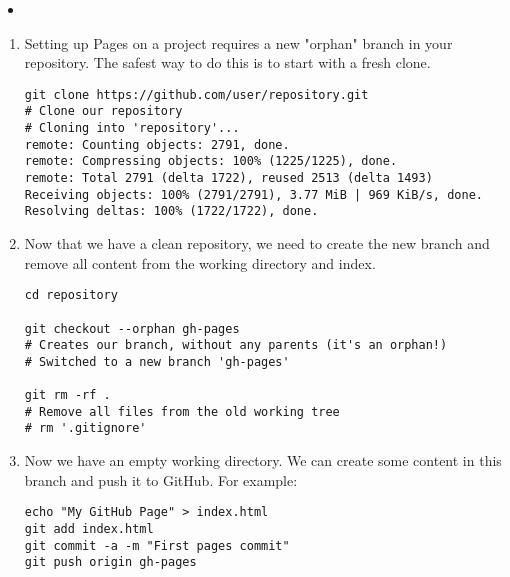 \begin{itemize}
\item
{}
\end{itemize}

\begin{enumerate}
\item
Setting up Pages on a project requires a new "orphan" branch in your repository. The safest way to do this is to start with a fresh clone.

\begin{verbatim}
git clone https://github.com/user/repository.git
# Clone our repository
# Cloning into 'repository'...
remote: Counting objects: 2791, done.
remote: Compressing objects: 100% (1225/1225), done.
remote: Total 2791 (delta 1722), reused 2513 (delta 1493)
Receiving objects: 100% (2791/2791), 3.77 MiB | 969 KiB/s, done.
Resolving deltas: 100% (1722/1722), done.
\end{verbatim}
\item
Now that we have a clean repository, we need to create the new branch and remove all content from the working directory and index.

\begin{verbatim}
cd repository

git checkout --orphan gh-pages
# Creates our branch, without any parents (it's an orphan!)
# Switched to a new branch 'gh-pages'

git rm -rf .
# Remove all files from the old working tree
# rm '.gitignore'
\end{verbatim}
\item
Now we have an empty working directory. We can create some content in this branch and push it to GitHub. For example:
\begin{verbatim}
echo "My GitHub Page" > index.html
git add index.html
git commit -a -m "First pages commit"
git push origin gh-pages
\end{verbatim}
\end{enumerate}

